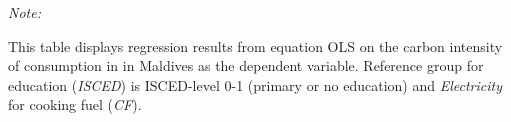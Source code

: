\begin{table}[htbp!]
\begin{adjustbox}{width = 1\textwidth, max height = 0.95\textheight, center}
\begin{threeparttable}[b]
         \begin{tablenotes}\item \medskip \textit{Note:}
            \item This table displays regression results from equation OLS on the carbon intensity of consumption in  in Maldives as the dependent variable. Reference group for education (\textit{ISCED}) is ISCED-level 0-1 (primary or no education) and \textit{Electricity} for cooking fuel (\textit{CF}).
         \end{tablenotes}
      \end{threeparttable}
   \end{adjustbox}
\end{table}



